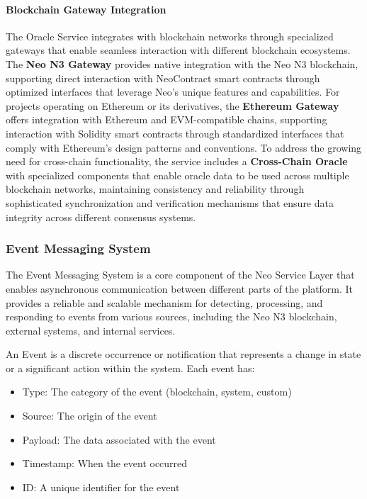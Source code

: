 \documentclass[12pt,a4paper]{article}
\begin{document}
\paragraph{Blockchain Gateway Integration}
The Oracle Service integrates with blockchain networks through specialized gateways that enable seamless interaction with different blockchain ecosystems. The \textbf{Neo N3 Gateway} provides native integration with the Neo N3 blockchain, supporting direct interaction with NeoContract smart contracts through optimized interfaces that leverage Neo's unique features and capabilities. For projects operating on Ethereum or its derivatives, the \textbf{Ethereum Gateway} offers integration with Ethereum and EVM-compatible chains, supporting interaction with Solidity smart contracts through standardized interfaces that comply with Ethereum's design patterns and conventions. To address the growing need for cross-chain functionality, the service includes a \textbf{Cross-Chain Oracle} with specialized components that enable oracle data to be used across multiple blockchain networks, maintaining consistency and reliability through sophisticated synchronization and verification mechanisms that ensure data integrity across different consensus systems.

\subsubsection{Event Messaging System}
\label{subsubsec:event-messaging}

The Event Messaging System is a core component of the Neo Service Layer that enables asynchronous communication between different parts of the platform. It provides a reliable and scalable mechanism for detecting, processing, and responding to events from various sources, including the Neo N3 blockchain, external systems, and internal services.



\begin{definition}[Event]
An Event is a discrete occurrence or notification that represents a change in state or a significant action within the system. Each event has:
\begin{itemize}
    \item Type: The category of the event (blockchain, system, custom)
    \item Source: The origin of the event
    \item Payload: The data associated with the event
    \item Timestamp: When the event occurred
    \item ID: A unique identifier for the event
\end{itemize}
\end{definition}
\end{document}
